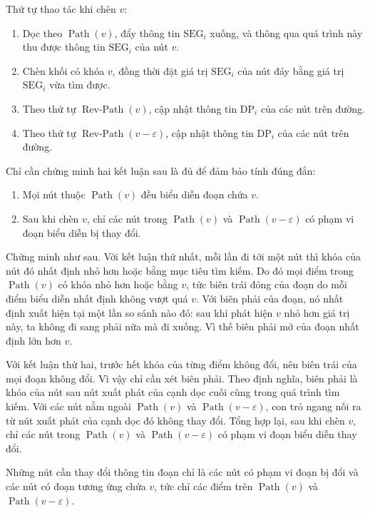 \documentclass[11pt]{article}
\newcommand{\Path}{\operatorname{Path}}
\newcommand{\RevPath}{\operatorname{Rev\mbox{-}Path}}
\newcommand{\DPi}{\mathrm{DP}_i}
\newcommand{\SEGi}{\mathrm{SEG}_i}
\begin{document}
Thứ tự thao tác khi chèn $v$:

\begin{enumerate}
  \item Dọc theo $\Path(v)$, đẩy thông tin $\SEGi$ xuống, và thông qua quá
  trình này thu được thông tin $\SEGi$ của nút $v$.
  \item Chèn khối có khóa $v$, đồng thời đặt giá trị $\SEGi$ của nút đáy bằng
  giá trị $\SEGi$ vừa tìm được.
  \item Theo thứ tự $\RevPath(v)$, cập nhật thông tin $\DPi$ của các nút trên
  đường.
  \item Theo thứ tự $\RevPath(v-\varepsilon)$, cập nhật thông tin $\DPi$ của
  các nút trên đường.
\end{enumerate}

Chỉ cần chứng minh hai kết luận sau là đủ để đảm bảo tính đúng đắn:

\begin{enumerate}
  \item Mọi nút thuộc $\Path(v)$ đều biểu diễn đoạn chứa $v$.
  \item Sau khi chèn $v$, chỉ các nút trong $\Path(v)$ và
  $\Path(v-\varepsilon)$ có phạm vi đoạn biểu diễn bị thay đổi.
\end{enumerate}

Chứng minh như sau. Với kết luận thứ nhất, mỗi lần đi tới một nút thì khóa của
nút đó nhất định nhỏ hơn hoặc bằng mục tiêu tìm kiếm. Do đó mọi điểm trong
$\Path(v)$ có khóa nhỏ hơn hoặc bằng $v$, tức biên trái đóng của đoạn do mỗi
điểm biểu diễn nhất định không vượt quá $v$. Với biên phải của đoạn, nó nhất
định xuất hiện tại một lần so sánh nào đó: sau khi phát hiện $v$ nhỏ hơn giá
trị này, ta không đi sang phải nữa mà đi xuống. Vì thế biên phải mở của đoạn
nhất định lớn hơn $v$.

Với kết luận thứ hai, trước hết khóa của từng điểm không đổi, nên biên trái
của mọi đoạn không đổi. Vì vậy chỉ cần xét biên phải. Theo định nghĩa, biên
phải là khóa của nút sau nút xuất phát của cạnh dọc cuối cùng trong quá trình
tìm kiếm. Với các nút nằm ngoài $\Path(v)$ và $\Path(v-\varepsilon)$, con trỏ
ngang nối ra từ nút xuất phát của cạnh dọc đó không thay đổi. Tổng hợp lại,
sau khi chèn $v$, chỉ các nút trong $\Path(v)$ và $\Path(v-\varepsilon)$ có
phạm vi đoạn biểu diễn thay đổi.

Những nút cần thay đổi thông tin đoạn chỉ là các nút có phạm vi đoạn bị đổi và
các nút có đoạn tương ứng chứa $v$, tức chỉ các điểm trên $\Path(v)$ và
$\Path(v-\varepsilon)$.
\end{document}
